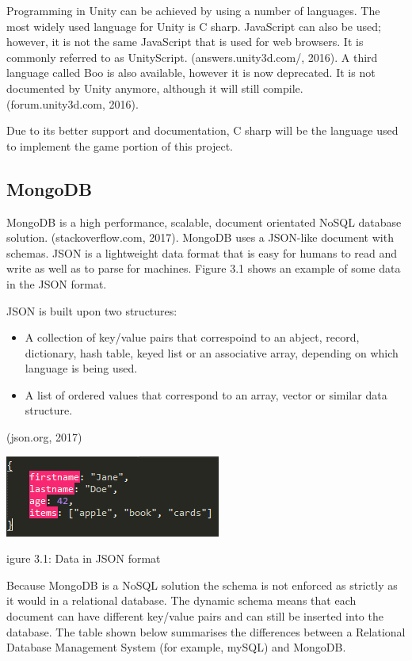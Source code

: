 \documentclass[12pt]{article}
\begin{document}
Programming in Unity can be achieved by using a number of languages. The most widely used language for Unity is C sharp. JavaScript can also be used; however, it is not the same JavaScript that is used for web browsers. It is commonly referred to as UnityScript. (answers.unity3d.com/, 2016). A third language called Boo is also available, however it is now deprecated. It is not documented by Unity anymore, although it will still compile. (forum.unity3d.com, 2016).

Due to its better support and documentation, C sharp will be the language used to implement the game portion of this project.

\begin{center}
\subsection{MongoDB}
\end{center}
MongoDB is a high performance, scalable, document orientated NoSQL database solution. (stackoverflow.com, 2017). MongoDB uses a JSON-like document with schemas. JSON is a lightweight data format that is easy for humans to read and write as well as to parse for machines. Figure 3.1 shows an example of some data in the JSON format.

JSON is built upon two structures: 
\begin{itemize}
	\item A collection of key/value pairs that correspoind to an abject, record, dictionary, hash table, keyed list or an associative array, depending on which language is being used.
	\item A list of ordered values that correspond to an array, vector or similar data structure. 
\end{itemize}

(json.org, 2017)

\begin{center}
	\includegraphics[scale=1]{json_no_id.PNG}
	
	\caption Figure 3.1: Data in JSON format
\end{center}

Because MongoDB is a NoSQL solution the schema is not enforced as strictly as it would in a relational database. The dynamic schema means that each document can have different key/value pairs and can still be inserted into the database. The table shown below summarises the differences between a Relational Database Management System (for example, mySQL) and MongoDB.
\end{document}
